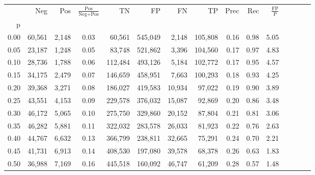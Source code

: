 \begin{tabular}{rrrcrrrrrrrrrrr}
\toprule
{} &     Neg &     Pos & $\frac{\text{Pos}}{\text{Neg}+\text{Pos}}$ &       TN &       FP &       FN &       TP &  Prec &   Rec & $\frac{\text{FP}}{\text{P}}$ \\
p    &         &         &                                            &          &          &          &          &       &       &                              \\
\midrule
0.00 &  60,561 &   2,148 &                                       0.03 &   60,561 &  545,049 &    2,148 &  105,808 &  0.16 &  0.98 &                         5.05 \\
0.05 &  23,187 &   1,248 &                                       0.05 &   83,748 &  521,862 &    3,396 &  104,560 &  0.17 &  0.97 &                         4.83 \\
0.10 &  28,736 &   1,788 &                                       0.06 &  112,484 &  493,126 &    5,184 &  102,772 &  0.17 &  0.95 &                         4.57 \\
0.15 &  34,175 &   2,479 &                                       0.07 &  146,659 &  458,951 &    7,663 &  100,293 &  0.18 &  0.93 &                         4.25 \\
0.20 &  39,368 &   3,271 &                                       0.08 &  186,027 &  419,583 &   10,934 &   97,022 &  0.19 &  0.90 &                         3.89 \\
0.25 &  43,551 &   4,153 &                                       0.09 &  229,578 &  376,032 &   15,087 &   92,869 &  0.20 &  0.86 &                         3.48 \\
0.30 &  46,172 &   5,065 &                                       0.10 &  275,750 &  329,860 &   20,152 &   87,804 &  0.21 &  0.81 &                         3.06 \\
0.35 &  46,282 &   5,881 &                                       0.11 &  322,032 &  283,578 &   26,033 &   81,923 &  0.22 &  0.76 &                         2.63 \\
0.40 &  44,767 &   6,632 &                                       0.13 &  366,799 &  238,811 &   32,665 &   75,291 &  0.24 &  0.70 &                         2.21 \\
0.45 &  41,731 &   6,913 &                                       0.14 &  408,530 &  197,080 &   39,578 &   68,378 &  0.26 &  0.63 &                         1.83 \\
0.50 &  36,988 &   7,169 &                                       0.16 &  445,518 &  160,092 &   46,747 &   61,209 &  0.28 &  0.57 &                         1.48 \\

\end{tabular}
